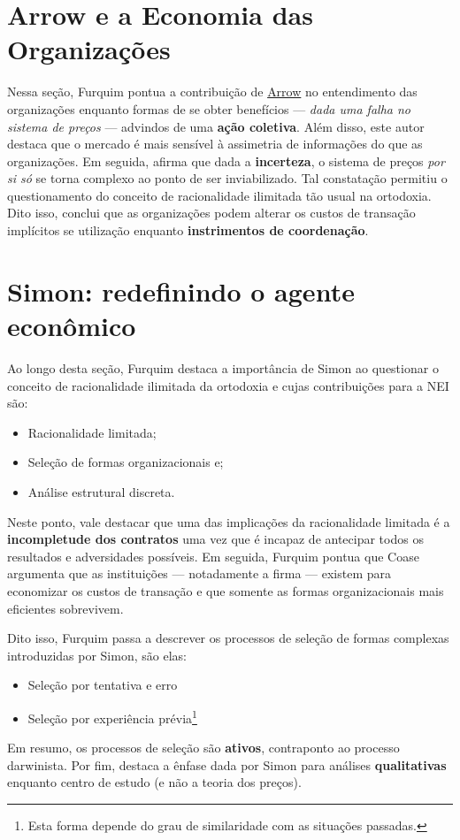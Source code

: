 \documentclass[9pt,twocolumn,twoside,lineno]{style}
\begin{document}
\section{Arrow e a Economia das Organizações}

Nessa seção, Furquim pontua a contribuição de \underline{Arrow} no entendimento das organizações enquanto formas de se obter benefícios --- \textit{dada uma falha no sistema de preços} --- advindos de uma \textbf{ação coletiva}. Além disso, este autor destaca que o mercado é mais sensível à assimetria de informações do que as organizações. Em seguida, afirma que dada a \textbf{incerteza}, o sistema de preços \textit{por si só} se torna complexo ao ponto de ser inviabilizado. Tal constatação permitiu o questionamento do conceito de racionalidade ilimitada tão usual na ortodoxia. Dito isso, conclui que as organizações podem alterar os custos de transação implícitos se utilização enquanto \textbf{instrimentos de coordenação}.


\section{Simon: redefinindo o agente econômico}

Ao longo desta seção, Furquim destaca a importância de Simon ao questionar o conceito de racionalidade ilimitada da ortodoxia e cujas contribuições para a NEI são:
\begin{itemize}
	\item Racionalidade limitada;
	\item Seleção de formas organizacionais e;
	\item Análise estrutural discreta.
\end{itemize}
Neste ponto, vale destacar que uma das implicações da racionalidade limitada é a \textbf{incompletude dos contratos} uma vez que é incapaz de antecipar todos os resultados e adversidades possíveis. Em seguida, Furquim pontua que Coase argumenta que as instituições --- notadamente a firma --- existem para economizar os custos de transação e que somente as formas organizacionais mais eficientes sobrevivem.

Dito isso, Furquim passa a descrever os processos de seleção de formas complexas introduzidas por Simon, são elas:
\begin{itemize}
	\item Seleção por tentativa e erro
	\item Seleção por experiência prévia\footnote{Esta forma depende do grau de similaridade com as situações passadas.}
\end{itemize}
Em resumo, os processos de seleção são \textbf{ativos}, contraponto ao processo darwinista. Por fim, destaca a ênfase dada por Simon para análises \textbf{qualitativas} enquanto centro de estudo (e não a teoria dos preços).
\end{document}
